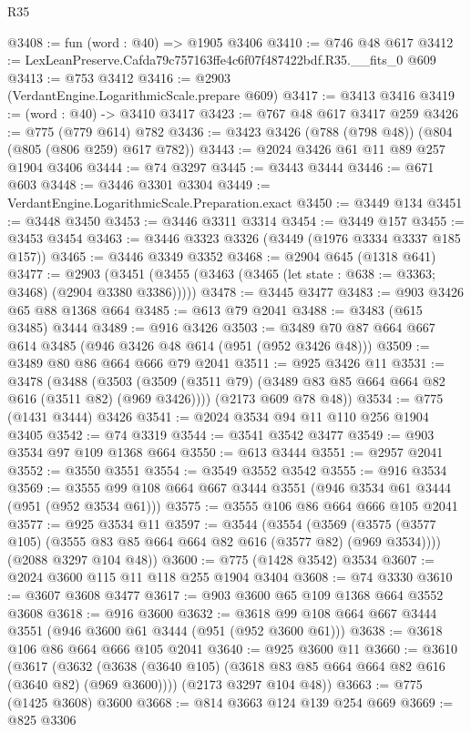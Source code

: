 \begin{lexlean}{R35}
\begin{coremodule}
@3408 := fun (word : @40) => @1905 @3406
@3410 := @746 @48 @617
@3412 := LexLeanPreserve.Cafda79c757163ffe4c6f07f487422bdf.R35.__fits_0 @609
@3413 := @753 @3412
@3416 := @2903 (VerdantEngine.LogarithmicScale.prepare @609)
@3417 := @3413 @3416
@3419 := (word : @40) -> @3410 @3417
@3423 := @767 @48 @617 @3417 @259
@3426 := @775 (@779 @614) @782
@3436 := @3423 @3426 (@788 (@798 @48)) (@804 (@805 (@806 @259) @617 @782))
@3443 := @2024 @3426 @61 @11 @89 @257 @1904 @3406
@3444 := @74 @3297
@3445 := @3443 @3444
@3446 := @671 @603
@3448 := @3446 @3301 @3304
@3449 := VerdantEngine.LogarithmicScale.Preparation.exact
@3450 := @3449 @134
@3451 := @3448 @3450
@3453 := @3446 @3311 @3314
@3454 := @3449 @157
@3455 := @3453 @3454
@3463 := @3446 @3323 @3326 (@3449 (@1976 @3334 @3337 @185 @157))
@3465 := @3446 @3349 @3352
@3468 := @2904 @645 (@1318 @641)
@3477 := @2903
    (@3451 (@3455 (@3463 (@3465 (let state : @638 := @3363; @3468) (@2904 @3380 @3386)))))
@3478 := @3445 @3477
@3483 := @903 @3426 @65 @88 @1368 @664
@3485 := @613 @79 @2041
@3488 := @3483 (@615 @3485) @3444
@3489 := @916 @3426
@3503 := @3489 @70 @87 @664 @667 @614 @3485 (@946 @3426 @48 @614 (@951 (@952 @3426 @48)))
@3509 := @3489 @80 @86 @664 @666 @79 @2041
@3511 := @925 @3426 @11
@3531 := @3478
    (@3488
      (@3503 (@3509 (@3511 @79) (@3489 @83 @85 @664 @664 @82 @616 (@3511 @82) (@969 @3426))))
      (@2173 @609 @78 @48))
@3534 := @775 (@1431 @3444) @3426
@3541 := @2024 @3534 @94 @11 @110 @256 @1904 @3405
@3542 := @74 @3319
@3544 := @3541 @3542 @3477
@3549 := @903 @3534 @97 @109 @1368 @664
@3550 := @613 @3444
@3551 := @2957 @2041
@3552 := @3550 @3551
@3554 := @3549 @3552 @3542
@3555 := @916 @3534
@3569 := @3555 @99 @108 @664 @667 @3444 @3551 (@946 @3534 @61 @3444 (@951 (@952 @3534 @61)))
@3575 := @3555 @106 @86 @664 @666 @105 @2041
@3577 := @925 @3534 @11
@3597 := @3544
    (@3554
      (@3569 (@3575 (@3577 @105) (@3555 @83 @85 @664 @664 @82 @616 (@3577 @82) (@969 @3534))))
      (@2088 @3297 @104 @48))
@3600 := @775 (@1428 @3542) @3534
@3607 := @2024 @3600 @115 @11 @118 @255 @1904 @3404
@3608 := @74 @3330
@3610 := @3607 @3608 @3477
@3617 := @903 @3600 @65 @109 @1368 @664 @3552 @3608
@3618 := @916 @3600
@3632 := @3618 @99 @108 @664 @667 @3444 @3551 (@946 @3600 @61 @3444 (@951 (@952 @3600 @61)))
@3638 := @3618 @106 @86 @664 @666 @105 @2041
@3640 := @925 @3600 @11
@3660 := @3610
    (@3617
      (@3632 (@3638 (@3640 @105) (@3618 @83 @85 @664 @664 @82 @616 (@3640 @82) (@969 @3600))))
      (@2173 @3297 @104 @48))
@3663 := @775 (@1425 @3608) @3600
@3668 := @814 @3663 @124 @139 @254 @669
@3669 := @825 @3306

\end{coremodule}
\end{lexlean}
